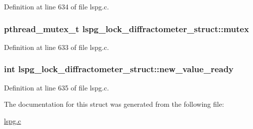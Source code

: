 Definition at line 634 of file lspg.\-c.

\hypertarget{structlspg__lock__diffractometer__struct_a362e848dfd1551428b8d12d8776fd2ed}{
\subsubsection[{mutex}]{\setlength{\rightskip}{0pt plus 5cm}pthread\-\_\-mutex\-\_\-t lspg\-\_\-lock\-\_\-diffractometer\-\_\-struct\-::mutex}}\label{structlspg__lock__diffractometer__struct_a362e848dfd1551428b8d12d8776fd2ed}


Definition at line 633 of file lspg.\-c.

\hypertarget{structlspg__lock__diffractometer__struct_ae94acdf44008ce48930e3083f08f5b6c}{
\subsubsection[{new\-\_\-value\-\_\-ready}]{\setlength{\rightskip}{0pt plus 5cm}int lspg\-\_\-lock\-\_\-diffractometer\-\_\-struct\-::new\-\_\-value\-\_\-ready}}\label{structlspg__lock__diffractometer__struct_ae94acdf44008ce48930e3083f08f5b6c}


Definition at line 635 of file lspg.\-c.



The documentation for this struct was generated from the following file\-:\begin{DoxyCompactItemize}
\item 
\hyperlink{lspg_8c}{lspg.\-c}\end{DoxyCompactItemize}

